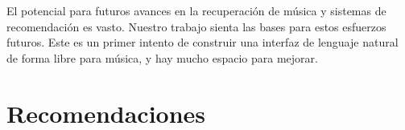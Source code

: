 El potencial para futuros avances en la recuperación de música y sistemas de recomendación es vasto. Nuestro trabajo sienta las bases para estos esfuerzos futuros. Este es un primer intento de construir una interfaz de lenguaje natural de forma libre para música, y hay mucho espacio para mejorar.

\chapter*{Recomendaciones}
\label{chap:recommendations}
